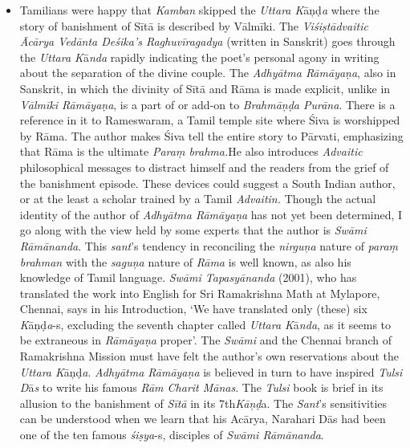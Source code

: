 \begin{itemize}
\item Tamilians were happy that \textit{Kamban} skipped the \textit{Uttara K}āņḍ\textit{a} where the story of banishment of Sītā is described by Vālmīki. The \textit{Viśiṣtādvaitic Ācārya Vedānta Deśika’s Raghuvīragadya} (written in Sanskrit) goes through the \textit{Uttara K}ā\textit{nda} rapidly indicating the poet’s personal agony in writing about the separation of the divine couple. The \textit{Adhyātma Rāmāyaṇa}, also in Sanskrit, in which the divinity of Sītā and Rāma is made explicit, unlike in \textit{Vālmīki Rāmāyaṇa}, is a part of or add-on to\textit{ Brahmāņḍa Purāna}. There is a reference in it to Rameswaram, a Tamil temple site where Śiva is worshipped by Rāma. The author makes Śiva tell the entire story to Pārvati, emphasizing that Rāma is the ultimate \textit{Paraṃ brahma.}He also introduces \textit{Advaitic} philosophical messages to distract himself and the readers from the grief of the banishment episode. These devices could suggest a South Indian author, or at the least a scholar trained by a Tamil \textit{Advaitin.} Though the actual identity of the author of \textit{Adhyātma Rāmāyaṇa} has not yet been determined, I go along with the view held by some experts that the author is \textit{Swāmi Rāmānanda}. This \textit{sant}’s tendency in reconciling the \textit{nirguņa} nature of \textit{paraṃ brahman} with the \textit{saguņa} nature of \textit{Rāma} is well known, as also his knowledge of Tamil language. \textit{Swāmi Tapasyānanda} (2001), who has translated the work into English for Sri Ramakrishna Math at Mylapore, Chennai, says in his Introduction, ‘We have translated only (these) six \textit{K}āņḍ\textit{a}-s, excluding the seventh chapter called \textit{Uttara K}ā\textit{nda}, as it seems to be extraneous in \textit{Rāmāyaṇa} proper’. The \textit{Swāmi} and the Chennai branch of Ramakrishna Mission must have felt the author’s own reservations about the \textit{Uttara K}āņḍ\textit{a}. \textit{Adhyātma Rāmāyaṇa} is believed in turn to have inspired \textit{Tulsi D}ā\textit{s} to write his famous \textit{Rām Charit Mānas}. The \textit{Tulsi} book is brief in its allusion to the banishment of \textit{Sītā} in its 7th\textit{Kāņḍ}a. The \textit{Sant}’s sensitivities can be understood when we learn that his Acārya, Narahari Dās had been one of the ten famous \textit{śiṣya}-s, disciples of \textit{Swāmi Rāmānanda}.

\end{itemize}


